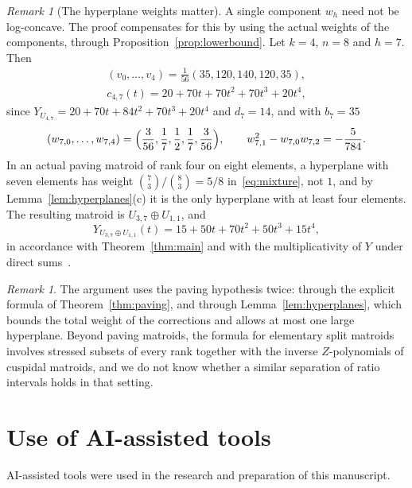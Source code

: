 \documentclass[11pt]{amsart}
\theoremstyle{definition}
\theoremstyle{remark}
\newtheorem{remark}[theorem]{Remark}
\numberwithin{equation}{section}
\begin{document}
\begin{remark}[The hyperplane weights matter]\label{rem:weights}
A single component $w_h$ need not be log-concave. The proof compensates for this by using the actual weights of the components, through Proposition~\ref{prop:lowerbound}. Let $k=4$, $n=8$ and $h=7$. Then
\begin{gather*}
(v_0,\dots,v_4)=\tfrac1{56}(35,120,140,120,35),\\
c_{4,7}(t)=20+70t+70t^2+70t^3+20t^4,
\end{gather*}
since $Y_{U_{4,7}}=20+70t+84t^2+70t^3+20t^4$ and $d_7=14$, and with $b_7=35$
\[
(w_{7,0},\dots,w_{7,4})=\Bigl(\frac{3}{56},\frac17,\frac12,\frac17,\frac3{56}\Bigr),\qquad
w_{7,1}^2-w_{7,0}w_{7,2}=-\frac{5}{784}.
\]
In an actual paving matroid of rank four on eight elements, a hyperplane with seven elements has weight $\binom73/\binom83=5/8$ in~\eqref{eq:mixture}, not $1$, and by Lemma~\ref{lem:hyperplanes}(c) it is the only hyperplane with at least four elements. The resulting matroid is $U_{3,7}\oplus U_{1,1}$, and
\[
Y_{U_{3,7}\oplus U_{1,1}}(t)=15+50t+70t^2+50t^3+15t^4,
\]
in accordance with Theorem~\ref{thm:main} and with the multiplicativity of $Y$ under direct sums~\cite[Proposition~2.3]{GRX}.
\end{remark}

\begin{remark}
The argument uses the paving hypothesis twice: through the explicit formula of Theorem~\ref{thm:paving}, and through Lemma~\ref{lem:hyperplanes}, which bounds the total weight of the corrections and allows at most one large hyperplane. Beyond paving matroids, the formula for elementary split matroids~\cite[Proposition~5.2]{GRX} involves stressed subsets of every rank together with the inverse $Z$-polynomials of cuspidal matroids, and we do not know whether a similar separation of ratio intervals holds in that setting.
\end{remark}

\section*{Use of AI-assisted tools}

AI-assisted tools were used in the research and preparation of this manuscript.
\end{document}
